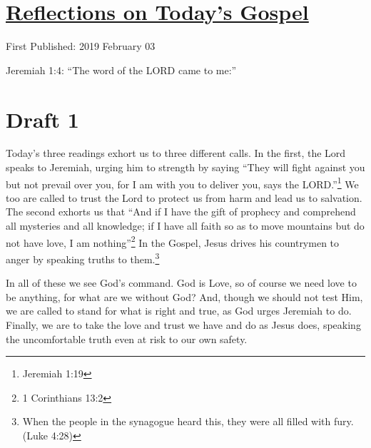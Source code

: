\documentclass[12pt]{article}[titlepage]
\newcommand{\say}[1]{``#1''}
\newcommand{\1}{\={a}}
\newcommand{\2}{\={e}}
\newcommand{\3}{\={\i}}
\newcommand{\4}{\=o}
\newcommand{\5}{\=u}
\newcommand{\6}{\={A}}
\renewcommand{\,}{\textsuperscript{,}}
\begin{document}
\doublespacing
\section{\href{reflections-on-readings-4-ordinary-c.html}{Reflections on Today's Gospel}}
First Published: 2019 February 03

Jeremiah 1:4: \say{The word of the LORD came to me:}

\section{Draft 1}
Today's three readings exhort us to three different calls.
In the first, the Lord speaks to Jeremiah, urging him to strength by saying \say{They will fight against you but not prevail over you, for I am with you to deliver you, says the LORD.}\footnote{Jeremiah 1:19}
We too are called to trust the Lord to protect us from harm and lead us to salvation.
The second exhorts us that \say{And if I have the gift of prophecy and comprehend all mysteries and all knowledge; if I have all faith so as to move mountains but do not have love, I am nothing}\footnote{1 Corinthians 13:2}
In the Gospel, Jesus drives his countrymen to anger by speaking truths to them.\footnote{When the people in the synagogue heard this, they were all filled with fury. (Luke 4:28)}

In all of these we see God's command.
God is Love, so of course we need love to be anything, for what are we without God?
And, though we should not test Him, we are called to stand for what is right and true, as God urges Jeremiah to do.
Finally, we are to take the love and trust we have and do as Jesus does, speaking the uncomfortable truth even at risk to our own safety.
\end{document}
